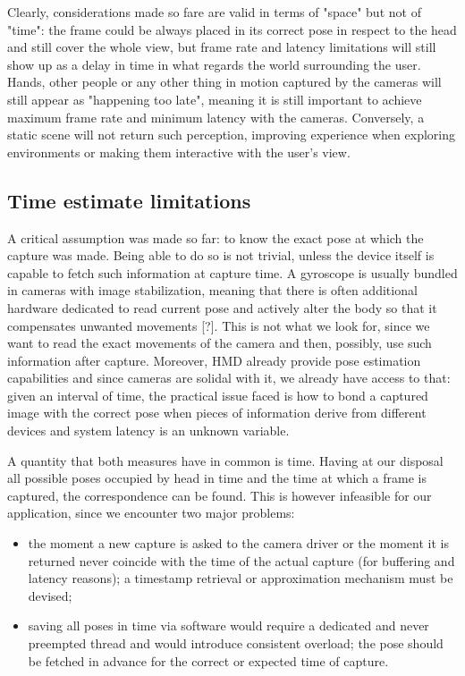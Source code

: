 Clearly, considerations made so fare are valid in terms of "space" but not of "time": the frame could be always placed in its correct pose in respect to the head and still cover the whole view, but frame rate and latency limitations will still show up as a delay in time in what regards the world surrounding the user. Hands, other people or any other thing in motion captured by the cameras will still appear as "happening too late", meaning it is still important to achieve maximum frame rate and minimum latency with the cameras. Conversely, a static scene will not return such perception, improving experience when exploring environments or making them interactive with the user's view.

\subsection{Time estimate limitations}
A critical assumption was made so far: to know the exact pose at which the capture was made. Being able to do so is not trivial, unless the device itself is capable to fetch such information at capture time. A gyroscope is usually bundled in cameras with image stabilization, meaning that there is often additional hardware dedicated to read current pose and actively alter the body so that it compensates unwanted movements [?]. This is not what we look for, since we want to read the exact movements of the camera and then, possibly, use such information after capture. Moreover, HMD already provide pose estimation capabilities and since cameras are solidal with it, we already have access to that: given an interval of time, the practical issue faced is how to bond a captured image with the correct pose when pieces of information derive from different devices and system latency is an unknown variable.

A quantity that both measures have in common is time. Having at our disposal all possible poses occupied by head in time and the time at which a frame is captured, the correspondence can be found. This is however infeasible for our application, since we encounter two major problems:
\begin{itemize}
\item the moment a new capture is asked to the camera driver or the moment it is returned never coincide with the time of the actual capture (for buffering and latency reasons); a timestamp retrieval or approximation mechanism must be devised;
\item saving all poses in time via software would require a dedicated and never preempted thread and would introduce consistent overload; the pose should be fetched in advance for the correct or expected time of capture.
\end{itemize}

